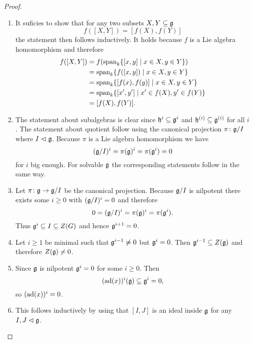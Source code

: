 \begin{proof}
 \begin{enumerate}
  \item
   It suficies to show that for any two subsets $X, Y \subseteq \mathfrak{g}$
   \[
    f([X,Y])= [f(X),f(Y)]
   \]
   the statement then follows inductively. It holds because $f$ is a Lie algebra homomorphism and therefore
   \begin{align*}
    f([X,Y])
    &= f(\operatorname{span}_k \{[x, y] \mid x \in X, y \in Y\}) \\
    &= \operatorname{span}_k \{f([x, y]) \mid x \in X, y \in Y\} \\
    &= \operatorname{span}_k \{[f(x),f(y)] \mid x \in X, y \in Y\} \\
    &= \operatorname{span}_k \{[x',y'] \mid x' \in f(X), y' \in f(Y)\} \\
    &= [f(X),f(Y)].
   \end{align*}
  \item
   The statement about subalgebras is clear since $\mathfrak{h}^i \subseteq \mathfrak{g}^i$ and $\mathfrak{h}^{(i)} \subseteq \mathfrak{g}^{(i)}$ for all $i$. The statement about quotient follow using the canonical projection $\pi \colon \mathfrak{g}/I$ where $I \vartriangleleft \mathfrak{g}$. Because $\pi$ is a Lie algebra homomorphism we have
   \[
    (\mathfrak{g}/I)^i = \pi(\mathfrak{g})^i = \pi(\mathfrak{g}^i) = 0
   \]
   for $i$ big enough. For solvable $\mathfrak{g}$ the corresponding statements follow in the same way.
  \item
   Let $\pi \colon \mathfrak{g} \to \mathfrak{g}/I$ be the canonical projection. Because $\mathfrak{g}/I$ is nilpotent there exists some $i \geq 0$ with $(\mathfrak{g}/I)^i = 0$ and therefore
   \[
    0 = (\mathfrak{g}/I)^i = \pi(\mathfrak{g})^i = \pi(\mathfrak{g}^i).
   \]
   Thus $\mathfrak{g}^i \subseteq I \subseteq Z(G)$ and hence $\mathfrak{g}^{i+1} = 0$.
  \item
   Let $i \geq 1$ be minimal such that $\mathfrak{g}^{i-1} \neq 0$ but $\mathfrak{g}^i = 0$. Then $\mathfrak{g}^{i-1} \subseteq Z(\mathfrak{g})$ and therefore $Z(\mathfrak{g}) \neq 0$.
  \item
   Since $\mathfrak{g}$ is nilpotent $\mathfrak{g}^i = 0$ for some $i \geq 0$. Then
   \[
    (\operatorname{ad}(x))^i(\mathfrak{g}) \subseteq \mathfrak{g}^i = 0,
   \]
   so $(\operatorname{ad}(x))^i = 0$.
  \item
   This follows inductively by using that $[I,J]$ is an ideal inside $\mathfrak{g}$ for any $I,J \vartriangleleft \mathfrak{g}$.
 \end{enumerate}
\end{proof}













































